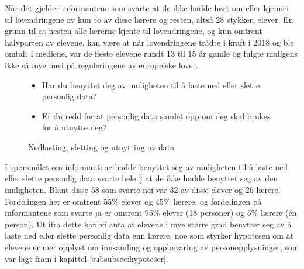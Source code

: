 Når det gjelder informantene som svarte at de ikke hadde hørt om eller kjenner til lovendringene av kun to av disse lærere og resten, altså 28 stykker, elever. En grunn til at nesten alle lærerne kjente til lovendringene, og kun omtrent halvparten av elevene, kan være at når lovendringene trådte i kraft i 2018 og ble omtalt i mediene, var de fleste elevene rundt 13 til 15 år gamle og fulgte muligens ikke så mye med på reguleringene av europeiske lover. 

\begin{figure}[H]
    \centering
    \begin{itemize}
        \item Har du benyttet deg av muligheten til å laste ned eller slette personlig data?
        \item Er du redd for at personlig data samlet opp om deg skal brukes for å utnytte deg?
    \end{itemize}
    \caption{Nedlasting, sletting og utnytting av data}
\end{figure}
I spørsmålet om informantene hadde benyttet seg av muligheten til å laste ned eller slette personlig data svarte hele $\frac{3}{4}$ at de ikke hadde benyttet seg av den muligheten. Blant disse 58 som svarte nei var 32 av disse elever og 26 lærere. Fordelingen her er omtrent 55\% elever og 45\% lærere, og fordelingen på informantene som svarte ja er omtrent 95\% elever (18 personer) og 5\% lærere (én person). Ut ifra dette kan vi anta at elevene i mye større grad benytter seg av å laste ned eller slette personlig data enn lærere, noe som styrker hypotesen om at elevene er mer opplyst om innsamling og oppbevaring av personopplysninger, som var lagt fram i kapittel \ref{subsubsec:hypoteser}.

